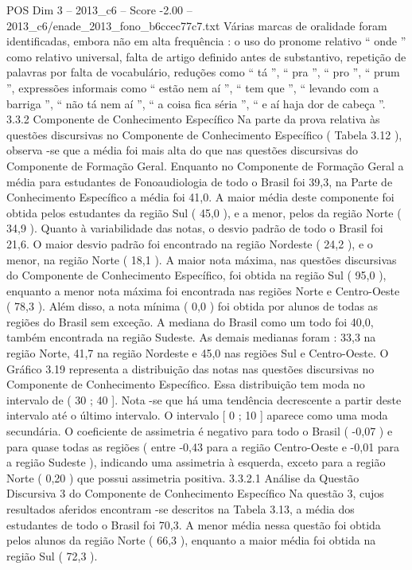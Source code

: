 \begin{textsample}{POS Dim 3 – 2013\_c6 – Score -2.00 – 2013\_c6/enade\_2013\_fono\_b6ccec77c7.txt}
Várias marcas de oralidade foram identificadas, embora não em alta frequência : o uso do pronome relativo “ onde ” como relativo universal, falta de artigo definido antes de substantivo, repetição de palavras por falta de vocabulário, reduções como “ tá ”, “ pra ”, “ pro ”, “ prum ”, expressões informais como “ estão nem aí ”, “ tem que ”, “ levando com a barriga ”, “ não tá nem aí ”, “ a coisa fica séria ”, “ e aí haja dor de cabeça ”. 3.3.2 Componente de Conhecimento Específico Na parte da prova relativa às questões discursivas no Componente de Conhecimento Específico ( Tabela 3.12 ), observa -se que a média foi mais alta do que nas questões discursivas do Componente de Formação Geral.
Enquanto no Componente de Formação Geral a média para estudantes de Fonoaudiologia de todo o Brasil foi 39,3, na Parte de Conhecimento Específico a média foi 41,0.
A maior média deste componente foi obtida pelos estudantes da região Sul ( 45,0 ), e a menor, pelos da região Norte ( 34,9 ).
Quanto à variabilidade das notas, o desvio padrão de todo o Brasil foi 21,6.
O maior desvio padrão foi encontrado na região Nordeste ( 24,2 ), e o menor, na região Norte ( 18,1 ).
A maior nota máxima, nas questões discursivas do Componente de Conhecimento Específico, foi obtida na região Sul ( 95,0 ), enquanto a menor nota máxima foi encontrada nas regiões Norte e Centro-Oeste ( 78,3 ).
Além disso, a nota mínima ( 0,0 ) foi obtida por alunos de todas as regiões do Brasil sem exceção.
A mediana do Brasil como um todo foi 40,0, também encontrada na região Sudeste.
As demais medianas foram : 33,3 na região Norte, 41,7 na região Nordeste e 45,0 nas regiões Sul e Centro-Oeste.
O Gráfico 3.19 representa a distribuição das notas nas questões discursivas no Componente de Conhecimento Específico.
Essa distribuição tem moda no intervalo de ( 30 ; 40 ].
Nota -se que há uma tendência decrescente a partir deste intervalo até o último intervalo.
O intervalo [ 0 ; 10 ] aparece como uma moda secundária.
O coeficiente de assimetria é negativo para todo o Brasil ( -0,07 ) e para quase todas as regiões ( entre -0,43 para a região Centro-Oeste e -0,01 para a região Sudeste ), indicando uma assimetria à esquerda, exceto para a região Norte ( 0,20 ) que possui assimetria positiva. 3.3.2.1 Análise da Questão Discursiva 3 do Componente de Conhecimento Específico Na questão 3, cujos resultados aferidos encontram -se descritos na Tabela 3.13, a média dos estudantes de todo o Brasil foi 70,3.
A menor média nessa questão foi obtida pelos alunos da região Norte ( 66,3 ), enquanto a maior média foi obtida na região Sul ( 72,3 ).

\end{textsample}
